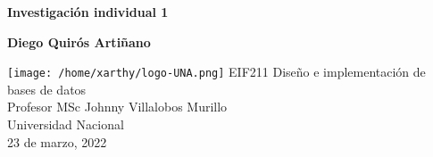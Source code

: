 \documentclass[12pt]{article}
\begin{document}
\begin{titlepage}
   \begin{center}
       \vspace*{1cm}

       \textbf{Investigación individual 1}

       \vfill

       \textbf{Diego Quirós Artiñano}
            
       \vfill
       \texttt{[image: /home/xarthy/logo-UNA.png]}
       \vfill
       EIF211 Diseño e implementación de bases de datos\\
       Profesor MSc Johnny Villalobos Murillo\\
       Universidad Nacional\\
       23 de marzo, 2022
            
   \end{center}
\end{titlepage}
\tableofcontents
\maketitle
\cite{postgres_installaition}

\printbibliography
\end{document}
